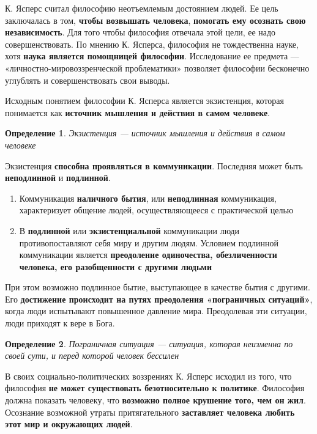 \documentclass{article}
\newtheorem{definition}{Определение}
\begin{document}
\begin{flushleft}

К. Ясперс считал философию неотъемлемым достоянием людей. Ее цель заключалась в том, \textbf{чтобы возвышать человека}, \textbf{помогать ему осознать свою независимость}. Для того чтобы философия отвечала этой цели, ее надо совершенствовать. По мнению К. Ясперса, философия не тождественна науке, хотя \textbf{наука является помощницей философии}. Исследование ее предмета — «личностно-мировоззренческой проблематики» позволяет философии бесконечно углублять и совершенствовать свои выводы.

Исходным понятием философии К. Ясперса является экзистенция, которая понимается как \textbf{источник мышления и действия в самом человеке}.

\begin{definition}
    Экзистенция — источник мышления и действия в самом человеке
\end{definition}

Экзистенция \textbf{способна проявляться в коммуникации}. Последняя может быть \textbf{неподлинной} и \textbf{подлинной}.

\begin{enumerate}
    \item Коммуникация \textbf{наличного бытия}, или \textbf{неподлинная} коммуникация, характеризует общение людей, осуществляющееся с практической целью
    \item  В \textbf{подлинной} или \textbf{экзистенциальной} коммуникации люди противопоставляют себя миру и другим людям. Условием подлинной коммуникации является \textbf{преодоление одиночества, обезличенности человека, его разобщенности с другими людьми}
\end{enumerate}

При этом возможно подлинное бытие, выступающее в качестве бытия с другими. Его \textbf{достижение происходит на путях преодоления «пограничных ситуаций»}, когда люди испытывают повышенное давление мира. Преодолевая эти ситуации, люди приходят к вере в Бога.

\begin{definition}
    Пограничная ситуация — ситуация, которая неизменна по своей сути, и перед которой человек бессилен
\end{definition}

В своих социально-политических воззрениях К. Ясперс исходил из того, что философия \textbf{не может существовать безотносительно к политике}. Философия должна показать человеку, что \textbf{возможно полное крушение того, чем он жил}. Осознание возможной утраты притягательного \textbf{заставляет человека любить этот мир и окружающих людей}.


\end{flushleft}
\end{document}
